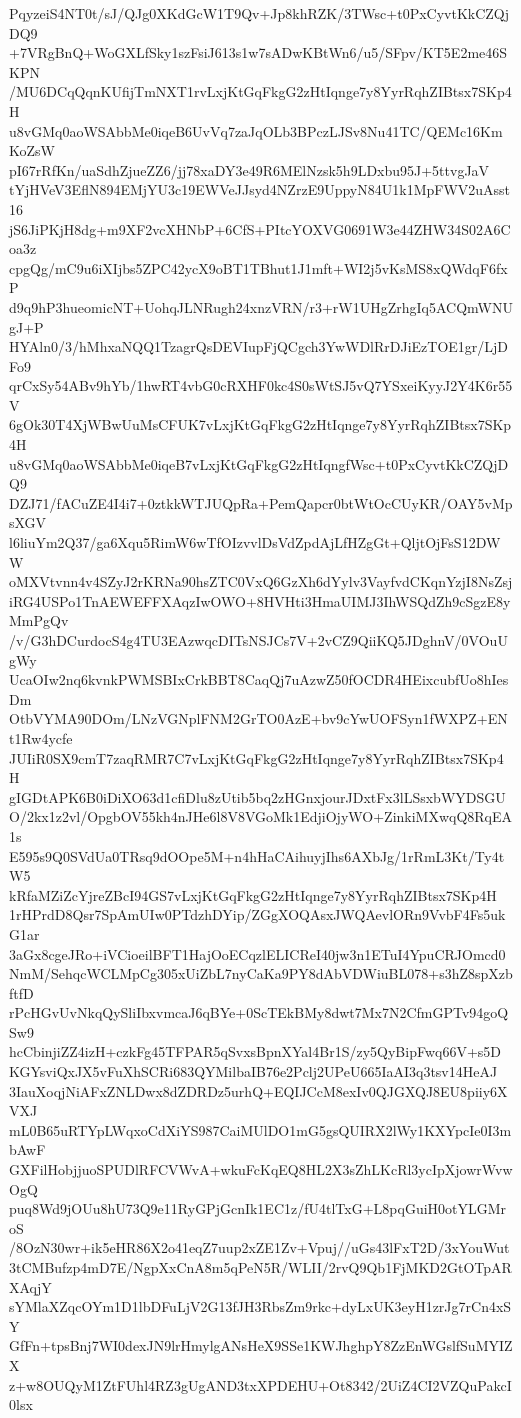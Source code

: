 PqyzeiS4NT0t/sJ/QJg0XKdGcW1T9Qv+Jp8khRZK/3TWsc+t0PxCyvtKkCZQjDQ9
+7VRgBnQ+WoGXLfSky1szFsiJ613s1w7sADwKBtWn6/u5/SFpv/KT5E2me46SKPN
/MU6DCqQqnKUfijTmNXT1rvLxjKtGqFkgG2zHtIqnge7y8YyrRqhZIBtsx7SKp4H
u8vGMq0aoWSAbbMe0iqeB6UvVq7zaJqOLb3BPczLJSv8Nu41TC/QEMc16KmKoZsW
pI67rRfKn/uaSdhZjueZZ6/jj78xaDY3e49R6MElNzsk5h9LDxbu95J+5ttvgJaV
tYjHVeV3EflN894EMjYU3c19EWVeJJsyd4NZrzE9UppyN84U1k1MpFWV2uAsst16
jS6JiPKjH8dg+m9XF2vcXHNbP+6CfS+PItcYOXVG0691W3e44ZHW34S02A6Coa3z
cpgQg/mC9u6iXIjbs5ZPC42ycX9oBT1TBhut1J1mft+WI2j5vKsMS8xQWdqF6fxP
d9q9hP3hueomicNT+UohqJLNRugh24xnzVRN/r3+rW1UHgZrhgIq5ACQmWNUgJ+P
HYAln0/3/hMhxaNQQ1TzagrQsDEVIupFjQCgch3YwWDlRrDJiEzTOE1gr/LjDFo9
qrCxSy54ABv9hYb/1hwRT4vbG0cRXHF0kc4S0sWtSJ5vQ7YSxeiKyyJ2Y4K6r55V
6gOk30T4XjWBwUuMsCFUK7vLxjKtGqFkgG2zHtIqnge7y8YyrRqhZIBtsx7SKp4H
u8vGMq0aoWSAbbMe0iqeB7vLxjKtGqFkgG2zHtIqngfWsc+t0PxCyvtKkCZQjDQ9
DZJ71/fACuZE4I4i7+0ztkkWTJUQpRa+PemQapcr0btWtOcCUyKR/OAY5vMpsXGV
l6liuYm2Q37/ga6Xqu5RimW6wTfOIzvvlDsVdZpdAjLfHZgGt+QljtOjFsS12DWW
oMXVtvnn4v4SZyJ2rKRNa90hsZTC0VxQ6GzXh6dYylv3VayfvdCKqnYzjI8NsZsj
iRG4USPo1TnAEWEFFXAqzIwOWO+8HVHti3HmaUIMJ3IhWSQdZh9cSgzE8yMmPgQv
/v/G3hDCurdocS4g4TU3EAzwqcDITsNSJCs7V+2vCZ9QiiKQ5JDghnV/0VOuUgWy
UcaOIw2nq6kvnkPWMSBIxCrkBBT8CaqQj7uAzwZ50fOCDR4HEixcubfUo8hIesDm
OtbVYMA90DOm/LNzVGNplFNM2GrTO0AzE+bv9cYwUOFSyn1fWXPZ+ENt1Rw4ycfe
JUIiR0SX9cmT7zaqRMR7C7vLxjKtGqFkgG2zHtIqnge7y8YyrRqhZIBtsx7SKp4H
gIGDtAPK6B0iDiXO63d1cfiDlu8zUtib5bq2zHGnxjourJDxtFx3lLSsxbWYDSGU
O/2kx1z2vl/OpgbOV55kh4nJHe6l8V8VGoMk1EdjiOjyWO+ZinkiMXwqQ8RqEA1s
E595s9Q0SVdUa0TRsq9dOOpe5M+n4hHaCAihuyjIhs6AXbJg/1rRmL3Kt/Ty4tW5
kRfaMZiZcYjreZBcI94GS7vLxjKtGqFkgG2zHtIqnge7y8YyrRqhZIBtsx7SKp4H
1rHPrdD8Qsr7SpAmUIw0PTdzhDYip/ZGgXOQAsxJWQAevlORn9VvbF4Fs5ukG1ar
3aGx8cgeJRo+iVCioeilBFT1HajOoECqzlELICReI40jw3n1ETuI4YpuCRJOmcd0
NmM/SehqcWCLMpCg305xUiZbL7nyCaKa9PY8dAbVDWiuBL078+s3hZ8spXzbftfD
rPcHGvUvNkqQySliIbxvmcaJ6qBYe+0ScTEkBMy8dwt7Mx7N2CfmGPTv94goQSw9
hcCbinjiZZ4izH+czkFg45TFPAR5qSvxsBpnXYal4Br1S/zy5QyBipFwq66V+s5D
KGYsviQxJX5vFuXhSCRi683QYMilbaIB76e2Pclj2UPeU665IaAI3q3tsv14HeAJ
3IauXoqjNiAFxZNLDwx8dZDRDz5urhQ+EQIJCcM8exIv0QJGXQJ8EU8piiy6XVXJ
mL0B65uRTYpLWqxoCdXiYS987CaiMUlDO1mG5gsQUIRX2lWy1KXYpcIe0I3mbAwF
GXFilHobjjuoSPUDlRFCVWvA+wkuFcKqEQ8HL2X3sZhLKcRl3ycIpXjowrWvwOgQ
puq8Wd9jOUu8hU73Q9e11RyGPjGcnIk1EC1z/fU4tlTxG+L8pqGuiH0otYLGMroS
/8OzN30wr+ik5eHR86X2o41eqZ7uup2xZE1Zv+Vpuj//uGs43lFxT2D/3xYouWut
3tCMBufzp4mD7E/NgpXxCnA8m5qPeN5R/WLII/2rvQ9Qb1FjMKD2GtOTpARXAqjY
sYMlaXZqcOYm1D1lbDFuLjV2G13fJH3RbsZm9rkc+dyLxUK3eyH1zrJg7rCn4xSY
GfFn+tpsBnj7WI0dexJN9lrHmylgANsHeX9SSe1KWJhghpY8ZzEnWGslfSuMYIZX
z+w8OUQyM1ZtFUhl4RZ3gUgAND3txXPDEHU+Ot8342/2UiZ4CI2VZQuPakcI0lsx

